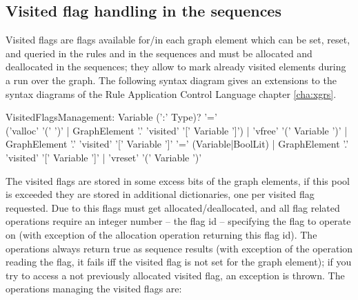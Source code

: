 \subsection{Visited flag handling in the sequences}\label{sec:visited}

Visited flags are flags available for/in each graph element which can be set, reset, and queried in the rules and in the sequences and must be allocated and deallocated in the sequences; they allow to mark already visited elements during a run over the graph. The following syntax diagram gives an extensions to the syntax diagrams of the Rule Application Control Language chapter \ref{cha:xgrs}.

\begin{rail}
  VisitedFlagsManagement:
    Variable (':' Type)? '=' \\('valloc' '(' ')' | GraphElement '.' 'visited' '[' Variable ']') |
    'vfree' '(' Variable ')' |
    GraphElement '.' 'visited' '[' Variable ']' '=' (Variable|BoolLit) |
    GraphElement '.' 'visited' '[' Variable ']' |
    'vreset' '(' Variable ')'
\end{rail}
The visited flags are stored in some excess bits of the graph elements, if this pool is exceeded they are stored in additional dictionaries, one per visited flag requested.
Due to this flags must get allocated/deallocated, and all flag related operations require an integer number -- the flag id -- specifying the flag to operate on (with exception of the allocation operation returning this flag id).
The operations always return true as sequence results (with exception of the operation reading the flag, it fails iff the visited flag is not set for the graph element);
if you try to access a not previously allocated visited flag, an exception is thrown.
The operations managing the visited flags are:
